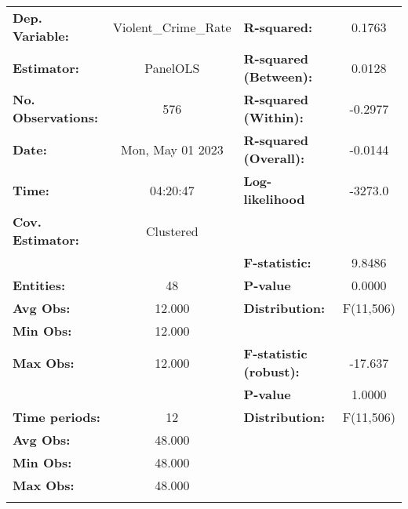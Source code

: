 \begin{center}
\begin{tabular}{lclc}
\toprule
\textbf{Dep. Variable:}           & Violent\_Crime\_Rate & \textbf{  R-squared:         }   &      0.1763      \\
\textbf{Estimator:}               &       PanelOLS       & \textbf{  R-squared (Between):}  &      0.0128      \\
\textbf{No. Observations:}        &         576          & \textbf{  R-squared (Within):}   &     -0.2977      \\
\textbf{Date:}                    &   Mon, May 01 2023   & \textbf{  R-squared (Overall):}  &     -0.0144      \\
\textbf{Time:}                    &       04:20:47       & \textbf{  Log-likelihood     }   &     -3273.0      \\
\textbf{Cov. Estimator:}          &      Clustered       & \textbf{                     }   &                  \\
\textbf{}                         &                      & \textbf{  F-statistic:       }   &      9.8486      \\
\textbf{Entities:}                &          48          & \textbf{  P-value            }   &      0.0000      \\
\textbf{Avg Obs:}                 &        12.000        & \textbf{  Distribution:      }   &    F(11,506)     \\
\textbf{Min Obs:}                 &        12.000        & \textbf{                     }   &                  \\
\textbf{Max Obs:}                 &        12.000        & \textbf{  F-statistic (robust):} &     -17.637      \\
\textbf{}                         &                      & \textbf{  P-value            }   &      1.0000      \\
\textbf{Time periods:}            &          12          & \textbf{  Distribution:      }   &    F(11,506)     \\
\textbf{Avg Obs:}                 &        48.000        & \textbf{                     }   &                  \\
\textbf{Min Obs:}                 &        48.000        & \textbf{                     }   &                  \\
\textbf{Max Obs:}                 &        48.000        & \textbf{                     }   &                  \\
\textbf{}                         &                      & \textbf{                     }   &                  \\

\end{tabular}
\end{center}
